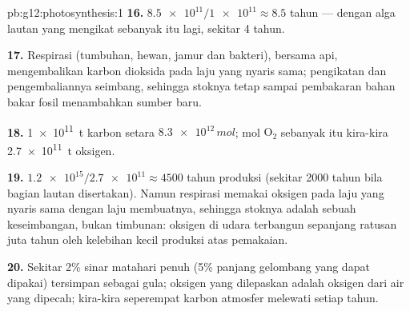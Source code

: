 \begin{solution}{pb:g12:photosynthesis:1}
\textbf{16.} $\num{8.5e11}/\num{1e11} \approx 8.5$ tahun --- dengan alga
lautan yang mengikat sebanyak itu lagi, sekitar 4 tahun.

\textbf{17.} Respirasi (tumbuhan, hewan, jamur dan bakteri), bersama
api, mengembalikan karbon dioksida pada laju yang nyaris sama;
pengikatan dan pengembaliannya seimbang, sehingga stoknya tetap sampai
pembakaran bahan bakar fosil menambahkan sumber baru.

\textbf{18.} \qty{1e11}{t} karbon setara $\num{8.3e12}\,\unit{mol}$;
mol $\mathrm{O_2}$ sebanyak itu kira-kira \qty{2.7e11}{t} oksigen.

\textbf{19.} $\num{1.2e15}/\num{2.7e11} \approx 4500$ tahun produksi
(sekitar 2000 tahun bila bagian lautan disertakan). Namun respirasi
memakai oksigen pada laju yang nyaris sama dengan laju 
membuatnya, sehingga stoknya adalah sebuah keseimbangan, bukan
timbunan: oksigen di udara terbangun sepanjang ratusan juta tahun oleh
kelebihan kecil produksi atas pemakaian.

\textbf{20.} Sekitar 2\% sinar matahari penuh (5\% panjang gelombang
yang dapat dipakai) tersimpan sebagai gula; oksigen yang dilepaskan
adalah oksigen dari air yang dipecah; kira-kira seperempat karbon
atmosfer melewati  setiap tahun.
\end{solution}
